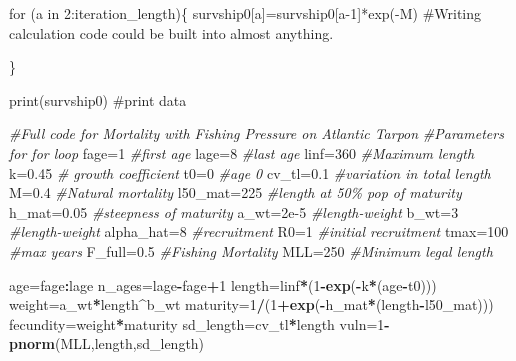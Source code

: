 \documentclass[
  12pt,
]{article}
\newenvironment{Shaded}{\begin{snugshade}}{\end{snugshade}}
\newcommand{\CommentTok}[1]{\textcolor[rgb]{0.56,0.35,0.01}{\textit{#1}}}
\newcommand{\DecValTok}[1]{\textcolor[rgb]{0.00,0.00,0.81}{#1}}
\newcommand{\FloatTok}[1]{\textcolor[rgb]{0.00,0.00,0.81}{#1}}
\newcommand{\FunctionTok}[1]{\textcolor[rgb]{0.13,0.29,0.53}{\textbf{#1}}}
\newcommand{\NormalTok}[1]{#1}
\newcommand{\OtherTok}[1]{\textcolor[rgb]{0.56,0.35,0.01}{#1}}
\newcommand{\SpecialCharTok}[1]{\textcolor[rgb]{0.81,0.36,0.00}{\textbf{#1}}}
\begin{document}
for (a in 2:iteration\_length)\{
survship0{[}a{]}=survship0{[}a-1{]}*exp(-M) \#Writing calculation code
could be built into almost anything.

\}

print(survship0) \#print data

\begin{Shaded}
\begin{Highlighting}[]
\CommentTok{\#Full code for Mortality with Fishing Pressure on Atlantic Tarpon}
\CommentTok{\#Parameters for for loop}
\NormalTok{fage}\OtherTok{=}\DecValTok{1} \CommentTok{\#first age}
\NormalTok{lage}\OtherTok{=}\DecValTok{8} \CommentTok{\#last age}
\NormalTok{linf}\OtherTok{=}\DecValTok{360} \CommentTok{\#Maximum length }
\NormalTok{k}\OtherTok{=}\FloatTok{0.45} \CommentTok{\# growth coefficient}
\NormalTok{t0}\OtherTok{=}\DecValTok{0} \CommentTok{\#age 0}
\NormalTok{cv\_tl}\OtherTok{=}\FloatTok{0.1} \CommentTok{\#variation in total length}
\NormalTok{M}\OtherTok{=}\FloatTok{0.4} \CommentTok{\#Natural mortality }
\NormalTok{l50\_mat}\OtherTok{=}\DecValTok{225} \CommentTok{\#length at 50\% pop of maturity}
\NormalTok{h\_mat}\OtherTok{=}\FloatTok{0.05} \CommentTok{\#steepness of maturity }
\NormalTok{a\_wt}\OtherTok{=}\FloatTok{2e{-}5} \CommentTok{\#length{-}weight}
\NormalTok{b\_wt}\OtherTok{=}\DecValTok{3} \CommentTok{\#length{-}weight}
\NormalTok{alpha\_hat}\OtherTok{=}\DecValTok{8} \CommentTok{\#recruitment}
\NormalTok{R0}\OtherTok{=}\DecValTok{1} \CommentTok{\#initial recruitment }
\NormalTok{tmax}\OtherTok{=}\DecValTok{100} \CommentTok{\#max years}
\NormalTok{F\_full}\OtherTok{=}\FloatTok{0.5} \CommentTok{\#Fishing Mortality}
\NormalTok{MLL}\OtherTok{=}\DecValTok{250} \CommentTok{\#Minimum legal length }

\NormalTok{age}\OtherTok{=}\NormalTok{fage}\SpecialCharTok{:}\NormalTok{lage}
\NormalTok{n\_ages}\OtherTok{=}\NormalTok{lage}\SpecialCharTok{{-}}\NormalTok{fage}\SpecialCharTok{+}\DecValTok{1}
\NormalTok{length}\OtherTok{=}\NormalTok{linf}\SpecialCharTok{*}\NormalTok{(}\DecValTok{1}\SpecialCharTok{{-}}\FunctionTok{exp}\NormalTok{(}\SpecialCharTok{{-}}\NormalTok{k}\SpecialCharTok{*}\NormalTok{(age}\SpecialCharTok{{-}}\NormalTok{t0)))}
\NormalTok{weight}\OtherTok{=}\NormalTok{a\_wt}\SpecialCharTok{*}\NormalTok{length}\SpecialCharTok{\^{}}\NormalTok{b\_wt}
\NormalTok{maturity}\OtherTok{=}\DecValTok{1}\SpecialCharTok{/}\NormalTok{(}\DecValTok{1}\SpecialCharTok{+}\FunctionTok{exp}\NormalTok{(}\SpecialCharTok{{-}}\NormalTok{h\_mat}\SpecialCharTok{*}\NormalTok{(length}\SpecialCharTok{{-}}\NormalTok{l50\_mat)))}
\NormalTok{fecundity}\OtherTok{=}\NormalTok{weight}\SpecialCharTok{*}\NormalTok{maturity}
\NormalTok{sd\_length}\OtherTok{=}\NormalTok{cv\_tl}\SpecialCharTok{*}\NormalTok{length}
\NormalTok{vuln}\OtherTok{=}\DecValTok{1}\SpecialCharTok{{-}}\FunctionTok{pnorm}\NormalTok{(MLL,length,sd\_length)}


\end{Highlighting}
\end{Shaded}
\end{document}
